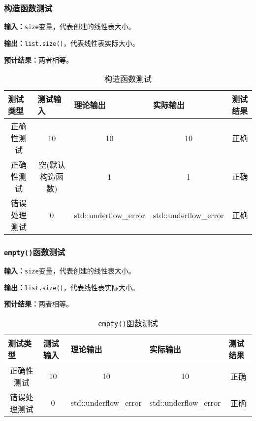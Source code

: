 \documentclass[format=draft,language=chinese,category=academic-report]{hustreport}
\begin{document}
\subsubsection{构造函数测试}
\textbf{输入：}\texttt{size}变量，代表创建的线性表大小。
\par
\textbf{输出：}\texttt{list.size()}，代表线性表实际大小。
\par
\textbf{预计结果：}两者相等。
\begin{table}[h]
\centering
\begin{tabular}{@{}ccccc@{}}
\toprule
\multicolumn{1}{l}{测试类型}    & \multicolumn{1}{l}{测试输入} & \multicolumn{1}{l}{理论输出} & \multicolumn{1}{l}{实际输出} & \multicolumn{1}{l}{测试结果} \\ \midrule
\multicolumn{1}{c|}{正确性测试}  & 10&10&10&正确\\
\multicolumn{1}{c|}{正确性测试}  & 空(默认构造函数)&1&1&正确\\
\multicolumn{1}{c|}{错误处理测试} & 0& std::underflow\_error& std::underflow\_error& 正确\\ \bottomrule
\end{tabular}
\caption{构造函数测试}
\label{tab:inittest}
\end{table}

\subsubsection{\texttt{empty()}函数测试}
\textbf{输入：}\texttt{size}变量，代表创建的线性表大小。
\par
\textbf{输出：}\texttt{list.size()}，代表线性表实际大小。
\par
\textbf{预计结果：}两者相等。
\begin{table}[h]
\centering
\begin{tabular}{@{}ccccc@{}}
\toprule
\multicolumn{1}{l}{测试类型}    & \multicolumn{1}{l}{测试输入} & \multicolumn{1}{l}{理论输出} & \multicolumn{1}{l}{实际输出} & \multicolumn{1}{l}{测试结果} \\ \midrule
\multicolumn{1}{c|}{正确性测试}  & 10&10&10&正确\\
\multicolumn{1}{c|}{错误处理测试} & 0& std::underflow\_error& std::underflow\_error& 正确\\ \bottomrule
\end{tabular}
\caption{\texttt{empty()}函数测试}
\label{tab:emptytest}
\end{table}
\end{document}
